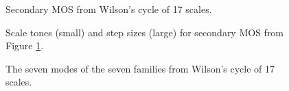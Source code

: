 \documentclass[a4paper,11pt]{article}
\begin{document}
\begin{figure}
\begin{subfigure}{\textwidth}

\vspace{0.0cm}
\end{subfigure}
\begin{subfigure}{\textwidth}

\vspace{0.0cm}
\end{subfigure}
\begin{subfigure}{\textwidth}

\vspace{0.0cm}
\end{subfigure}
\caption{Secondary MOS from Wilson's cycle of 17 scales.}
\label{fig:secondary-mos-17}
\end{figure}
\egroup
\restoregeometry

\begin{figure}
\centering

\caption{Scale tones (small) and step sizes (large) for secondary MOS from
Figure \ref{fig:secondary-mos-17}.}
\label{fig:secondary-mos-17-steps}
\end{figure}

\begin{figure}

\caption{The seven modes of the seven families from Wilson's cycle of 17 scales.}
\label{fig:secondary-mos-17-modes}
\end{figure}
\restoregeometry
\end{document}
